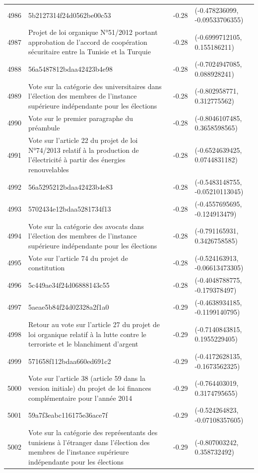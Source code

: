 \begin{table}[ht]
\begin{tabular}{rlrl}
  4986 & 5b2127314f24d0562be00c53 & -0.28 & (-0.478236099, -0.09533706355) \\ 
  4987 & Projet de loi organique N°51/2012 portant approbation de l'accord de coopération sécuritaire entre la Tunisie et la Turquie & -0.28 & (-0.6999712105, 0.155186211) \\ 
  4988 & 56a5487812bdaa42423b4e98 & -0.28 & (-0.7024947085, 0.088928241) \\ 
  4989 & Vote sur la catégorie des universitaires dans l'élection des membres de l'instance supérieure indépendante pour les élections & -0.28 & (-0.802958771, 0.312775562) \\ 
  4990 & Vote sur le premier paragraphe du préambule & -0.28 & (-0.8046107485, 0.3658598565) \\ 
  4991 & Vote sur l'article 22 du projet de loi N°74/2013 relatif à la production de l'électricité à partir des énergies renouvelables & -0.28 & (-0.6524639425, 0.0744831182) \\ 
  4992 & 56a5295212bdaa42423b4e83 & -0.28 & (-0.5483148755, -0.05210113045) \\ 
  4993 & 5702434e12bdaa5281734f13 & -0.28 & (-0.4557695695, -0.124913479) \\ 
  4994 & Vote sur la catégorie des avocats dans l'élection des membres de l'instance supérieure indépendante pour les élections & -0.28 & (-0.791165931, 0.3426758585) \\ 
  4995 & Vote sur l'article 74 du projet de constitution & -0.28 & (-0.524163913, -0.06613473305) \\ 
  4996 & 5c449ae34f24d06888143c55 & -0.28 & (-0.4048788775, -0.179378497) \\ 
  4997 & 5aeae5b84f24d02328a2f1a0 & -0.29 & (-0.4638934185, -0.1199140795) \\ 
  4998 & Retour au vote sur l'article 27 du projet de loi organique relatif à la lutte contre le terroriste et le blanchiment d'argent & -0.29 & (-0.7140843815, 0.1955229405) \\ 
  4999 & 571658f112bdaa660ed691c2 & -0.29 & (-0.4172628135, -0.1673562325) \\ 
  5000 & Vote sur l'article 38 (article 59 dans la version initiale) du projet de loi finances complémentaire pour l'année 2014 & -0.29 & (-0.764403019, 0.3174795655) \\ 
  5001 & 59a7f3eabc116175e36ace7f & -0.29 & (-0.524264823, -0.07108357605) \\ 
  5002 & Vote sur la catégorie des représentants des tunisiens à l'étranger dans l'élection des membres de l'instance supérieure indépendante pour les élections & -0.29 & (-0.807003242, 0.358732492) \\ 

\end{tabular}
\end{table}
